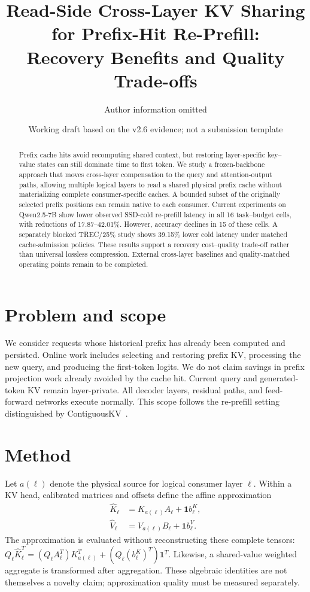 \documentclass[10pt]{article}
\title{Read-Side Cross-Layer KV Sharing for Prefix-Hit Re-Prefill:\\Recovery Benefits and Quality Trade-offs}
\author{Author information omitted}
\date{Working draft based on the v2.6 evidence; not a submission template}
\begin{document}
\maketitle
\begin{abstract}
Prefix cache hits avoid recomputing shared context, but restoring layer-specific
key--value states can still dominate time to first token. We study a frozen-backbone
approach that moves cross-layer compensation to the query and attention-output
paths, allowing multiple logical layers to read a shared physical prefix cache
without materializing complete consumer-specific caches. A bounded subset of the
originally selected prefix positions can remain native to each consumer. Current
experiments on Qwen2.5-7B show lower observed SSD-cold re-prefill latency in all
16 task--budget cells, with reductions of 17.87--42.01\%. However, accuracy declines
in 15 of these cells. A separately blocked TREC/25\% study shows 39.15\% lower cold
latency under matched cache-admission policies. These results support a recovery
cost--quality trade-off rather than universal lossless compression. External
cross-layer baselines and quality-matched operating points remain to be completed.
\end{abstract}

\section{Problem and scope}
We consider requests whose historical prefix has already been computed and
persisted. Online work includes selecting and restoring prefix KV, processing the
new query, and producing the first-token logits. We do not claim savings in prefix
projection work already avoided by the cache hit. Current query and generated-token
KV remain layer-private. All decoder layers, residual paths, and feed-forward
networks execute normally. This scope follows the re-prefill setting distinguished
by ContiguousKV~\cite{contiguouskv}.

\section{Method}
Let $a(\ell)$ denote the physical source for logical consumer layer $\ell$.
Within a KV head, calibrated matrices and offsets define the affine approximation
\begin{align}
 \widehat K_\ell &= K_{a(\ell)}A_\ell+\mathbf{1}b^K_\ell,\\
 \widehat V_\ell &= V_{a(\ell)}B_\ell+\mathbf{1}b^V_\ell.
\end{align}
The approximation is evaluated without reconstructing these complete tensors:
$Q_\ell\widehat K_\ell^T=(Q_\ell A_\ell^T)K_{a(\ell)}^T+
(Q_\ell(b^K_\ell)^T)\mathbf{1}^T$. Likewise, a shared-value weighted aggregate is
transformed after aggregation. These algebraic identities are not themselves a
novelty claim; approximation quality must be measured separately.
\end{document}
